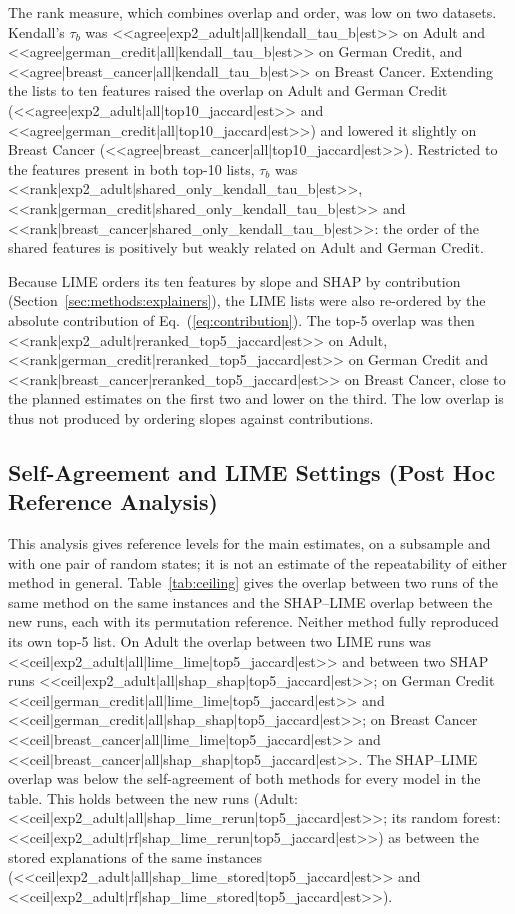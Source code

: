 The rank measure, which combines overlap and order, was low on two datasets. Kendall's
$\tau_b$ was
<<agree|exp2_adult|all|kendall_tau_b|est>> on Adult and
<<agree|german_credit|all|kendall_tau_b|est>> on German Credit, and
<<agree|breast_cancer|all|kendall_tau_b|est>> on Breast Cancer. Extending the lists to
ten features raised the overlap on Adult and German Credit
(<<agree|exp2_adult|all|top10_jaccard|est>> and
<<agree|german_credit|all|top10_jaccard|est>>) and lowered it slightly on Breast Cancer
(<<agree|breast_cancer|all|top10_jaccard|est>>). Restricted to the features present in
both top-10 lists, $\tau_b$ was <<rank|exp2_adult|shared_only_kendall_tau_b|est>>,
<<rank|german_credit|shared_only_kendall_tau_b|est>> and
<<rank|breast_cancer|shared_only_kendall_tau_b|est>>: the order of the shared features is
positively but weakly related on Adult and German Credit.

Because LIME orders its ten features by slope and SHAP by contribution
(Section~\ref{sec:methods:explainers}), the LIME lists were also re-ordered by the absolute
contribution of Eq.~(\ref{eq:contribution}). The top-5 overlap was then
<<rank|exp2_adult|reranked_top5_jaccard|est>> on Adult,
<<rank|german_credit|reranked_top5_jaccard|est>> on German Credit and
<<rank|breast_cancer|reranked_top5_jaccard|est>> on Breast Cancer, close to the planned
estimates on the first two and lower on the third. The low overlap is thus not produced
by ordering slopes against contributions.

\subsection{Self-Agreement and LIME Settings (Post Hoc Reference Analysis)}
\label{sec:results:ceiling}

This analysis gives reference levels for the main estimates, on a subsample and with one
pair of random states; it is not an estimate of the repeatability of either method in
general. Table~\ref{tab:ceiling} gives the overlap between two runs of the same method on the same
instances and the SHAP--LIME overlap between the new runs, each with its permutation
reference. Neither method fully reproduced its own top-5 list. On Adult the overlap between two LIME runs
was <<ceil|exp2_adult|all|lime_lime|top5_jaccard|est>> and between two SHAP runs
<<ceil|exp2_adult|all|shap_shap|top5_jaccard|est>>; on German Credit
<<ceil|german_credit|all|lime_lime|top5_jaccard|est>> and
<<ceil|german_credit|all|shap_shap|top5_jaccard|est>>; on Breast Cancer
<<ceil|breast_cancer|all|lime_lime|top5_jaccard|est>> and
<<ceil|breast_cancer|all|shap_shap|top5_jaccard|est>>. The SHAP--LIME overlap was below
the self-agreement of both methods for every model in the table. This holds between the
new runs (Adult: <<ceil|exp2_adult|all|shap_lime_rerun|top5_jaccard|est>>; its random forest: <<ceil|exp2_adult|rf|shap_lime_rerun|top5_jaccard|est>>)
as between the stored explanations of the same instances (<<ceil|exp2_adult|all|shap_lime_stored|top5_jaccard|est>> and
<<ceil|exp2_adult|rf|shap_lime_stored|top5_jaccard|est>>).

